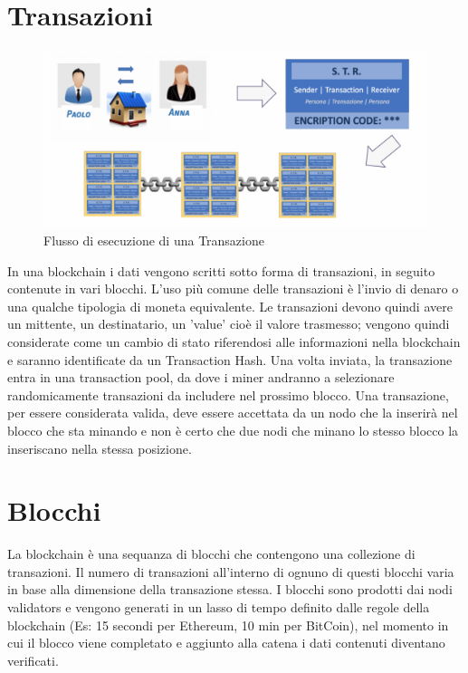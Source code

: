 \documentclass[11pt,a4paper,titlepage,twoside,openright]{report}
\begin{document}
\section{Transazioni}
\begin{figure}[h]
	\includegraphics[width=\textwidth]{flusso_bc}
	\centering
	\caption{Flusso di esecuzione di una Transazione}
	\label{fig:fl_bc}
\end{figure}
In una blockchain i dati vengono scritti sotto forma di transazioni, in seguito contenute in vari blocchi. L'uso più comune delle transazioni è l'invio di denaro o una qualche tipologia di moneta equivalente. Le transazioni devono quindi avere un mittente, un destinatario, un 'value' cioè il valore trasmesso; vengono quindi considerate come un cambio di stato riferendosi alle informazioni nella blockchain e saranno identificate da un Transaction Hash. Una volta inviata, la transazione entra in una transaction pool, da dove i miner andranno a selezionare randomicamente transazioni da includere nel prossimo blocco. Una transazione, per essere considerata valida, deve essere accettata da un nodo che la inserirà nel blocco che sta minando e non è certo che due nodi che minano lo stesso blocco la inseriscano nella stessa posizione.

\section{Blocchi}
La blockchain è una sequanza di blocchi che contengono una collezione di transazioni. Il numero di transazioni all'interno di ognuno di questi blocchi varia in base alla dimensione della transazione stessa. I blocchi sono prodotti dai nodi validators e vengono generati in un lasso di tempo definito dalle regole della blockchain (Es: 15 secondi per Ethereum, 10 min per BitCoin), nel momento in cui il blocco viene completato e aggiunto alla catena i dati contenuti diventano verificati.
\end{document}
